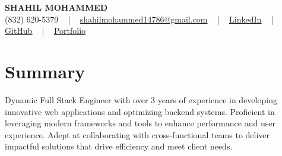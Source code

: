 \documentclass[letterpaper,10pt]{article}
\begin{document}
\begin{center}
    {\fontsize{14pt}{12pt}\selectfont \textbf{\MakeUppercase{Shahil Mohammed}}}\\ \vspace{2pt}
    \fontsize{10pt}{12pt}\selectfont (832) 620-5379 ~ | ~ \href{mailto:shahilmohammed14786@gmail.com}{shahilmohammed14786@gmail.com} ~ | ~  
    \href{https://www.linkedin.com/in/shahil-mohammed-9652931a1/}{\color{blue}\underline{LinkedIn}}  ~ | ~ 
    \href{https://github.com/freakbeast14}{\color{blue}\underline{GitHub}} ~ | ~ 
    \href{https://shahil-mohammed.netlify.app/}{\color{blue}\underline{Portfolio}}
    \vspace{-8pt}
\end{center}

\section{Summary}
\vspace{-2pt}\fontsize{8pt}{9pt}\selectfont
Dynamic Full Stack Engineer with over 3 years of experience in developing innovative web applications and optimizing backend systems. Proficient in leveraging modern frameworks and tools to enhance performance and user experience. Adept at collaborating with cross-functional teams to deliver impactful solutions that drive efficiency and meet client needs.

\vspace{-5pt}
 
\vspace{-2pt}
\end{document}

